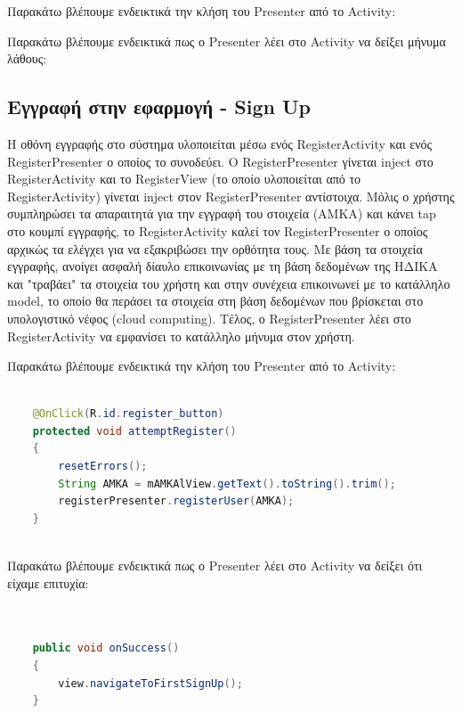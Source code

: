    		Παρακάτω βλέπουμε ενδεικτικά την κλήση του Presenter από το Activity:
   		
		
		Παρακάτω βλέπουμε ενδεικτικά πως ο Presenter λέει στο Activity να δείξει μήνυμα λάθους:
		



\subsection{Εγγραφή στην εφαρμογή - Sign Up}	

		

   		Η οθόνη εγγραφής στο σύστημα υλοποιείται μέσω ενός RegisterActivity και ενός RegisterPresenter ο οποίος το συνοδεύει. Ο RegisterPresenter γίνεται inject στο RegisterActivity και το RegisterView (το οποίο υλοποιείται από το RegisterActivity) γίνεται inject στον RegisterPresenter αντίστοιχα. Μόλις ο χρήστης συμπληρώσει τα απαραιτητά για την εγγραφή του στοιχεία (ΑΜΚΑ) και κάνει tap στο κουμπί εγγραφής, το RegisterActivity καλεί τον RegisterPresenter ο οποίος αρχικώς τα ελέγχει για να εξακριβώσει την ορθότητα τους. Με βάση τα στοιχεία εγγραφής, ανοίγει ασφαλή δίαυλο επικοινωνίας με τη βάση δεδομένων της ΗΔΙΚΑ και "τραβάει" τα στοιχεία του χρήστη και στην συνέχεια επικοινωνεί με το κατάλληλο model, το οποίο θα περάσει τα στοιχεία στη βάση δεδομένων που βρίσκεται στο υπολογιστικό νέφος (cloud computing). Τέλος, ο RegisterPresenter λέει στο RegisterActivity να εμφανίσει το κατάλληλο μήνυμα στον χρήστη.
   
   		
   		Παρακάτω βλέπουμε ενδεικτικά την κλήση του Presenter από το Activity:
   			
   			
   				\begin{lstlisting}[language=Java]			
		
    @OnClick(R.id.register_button)
    protected void attemptRegister()
    {
        resetErrors();
        String AMKA = mAMKAlView.getText().toString().trim();
        registerPresenter.registerUser(AMKA);
    }
    
		\end{lstlisting}
		
		Παρακάτω βλέπουμε ενδεικτικά πως ο Presenter λέει στο Activity να δείξει ότι είχαμε επιτυχία:
	
	
   	\begin{lstlisting}[language=Java]			

	
	public void onSuccess()
    {
        view.navigateToFirstSignUp();
    }
    
    	\end{lstlisting}
	
